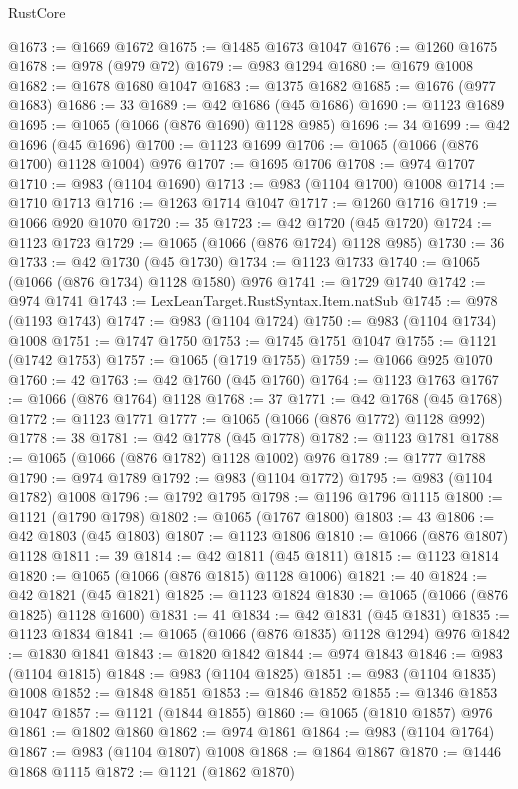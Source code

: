 \begin{lexlean}{RustCore}
\begin{coremodule}
@1673 := @1669 @1672
@1675 := @1485 @1673 @1047
@1676 := @1260 @1675
@1678 := @978 (@979 @72)
@1679 := @983 @1294
@1680 := @1679 @1008
@1682 := @1678 @1680 @1047
@1683 := @1375 @1682
@1685 := @1676 (@977 @1683)
@1686 := 33
@1689 := @42 @1686 (@45 @1686)
@1690 := @1123 @1689
@1695 := @1065 (@1066 (@876 @1690) @1128 @985)
@1696 := 34
@1699 := @42 @1696 (@45 @1696)
@1700 := @1123 @1699
@1706 := @1065 (@1066 (@876 @1700) @1128 @1004) @976
@1707 := @1695 @1706
@1708 := @974 @1707
@1710 := @983 (@1104 @1690)
@1713 := @983 (@1104 @1700) @1008
@1714 := @1710 @1713
@1716 := @1263 @1714 @1047
@1717 := @1260 @1716
@1719 := @1066 @920 @1070
@1720 := 35
@1723 := @42 @1720 (@45 @1720)
@1724 := @1123 @1723
@1729 := @1065 (@1066 (@876 @1724) @1128 @985)
@1730 := 36
@1733 := @42 @1730 (@45 @1730)
@1734 := @1123 @1733
@1740 := @1065 (@1066 (@876 @1734) @1128 @1580) @976
@1741 := @1729 @1740
@1742 := @974 @1741
@1743 := LexLeanTarget.RustSyntax.Item.natSub
@1745 := @978 (@1193 @1743)
@1747 := @983 (@1104 @1724)
@1750 := @983 (@1104 @1734) @1008
@1751 := @1747 @1750
@1753 := @1745 @1751 @1047
@1755 := @1121 (@1742 @1753)
@1757 := @1065 (@1719 @1755)
@1759 := @1066 @925 @1070
@1760 := 42
@1763 := @42 @1760 (@45 @1760)
@1764 := @1123 @1763
@1767 := @1066 (@876 @1764) @1128
@1768 := 37
@1771 := @42 @1768 (@45 @1768)
@1772 := @1123 @1771
@1777 := @1065 (@1066 (@876 @1772) @1128 @992)
@1778 := 38
@1781 := @42 @1778 (@45 @1778)
@1782 := @1123 @1781
@1788 := @1065 (@1066 (@876 @1782) @1128 @1002) @976
@1789 := @1777 @1788
@1790 := @974 @1789
@1792 := @983 (@1104 @1772)
@1795 := @983 (@1104 @1782) @1008
@1796 := @1792 @1795
@1798 := @1196 @1796 @1115
@1800 := @1121 (@1790 @1798)
@1802 := @1065 (@1767 @1800)
@1803 := 43
@1806 := @42 @1803 (@45 @1803)
@1807 := @1123 @1806
@1810 := @1066 (@876 @1807) @1128
@1811 := 39
@1814 := @42 @1811 (@45 @1811)
@1815 := @1123 @1814
@1820 := @1065 (@1066 (@876 @1815) @1128 @1006)
@1821 := 40
@1824 := @42 @1821 (@45 @1821)
@1825 := @1123 @1824
@1830 := @1065 (@1066 (@876 @1825) @1128 @1600)
@1831 := 41
@1834 := @42 @1831 (@45 @1831)
@1835 := @1123 @1834
@1841 := @1065 (@1066 (@876 @1835) @1128 @1294) @976
@1842 := @1830 @1841
@1843 := @1820 @1842
@1844 := @974 @1843
@1846 := @983 (@1104 @1815)
@1848 := @983 (@1104 @1825)
@1851 := @983 (@1104 @1835) @1008
@1852 := @1848 @1851
@1853 := @1846 @1852
@1855 := @1346 @1853 @1047
@1857 := @1121 (@1844 @1855)
@1860 := @1065 (@1810 @1857) @976
@1861 := @1802 @1860
@1862 := @974 @1861
@1864 := @983 (@1104 @1764)
@1867 := @983 (@1104 @1807) @1008
@1868 := @1864 @1867
@1870 := @1446 @1868 @1115
@1872 := @1121 (@1862 @1870)

\end{coremodule}
\end{lexlean}
